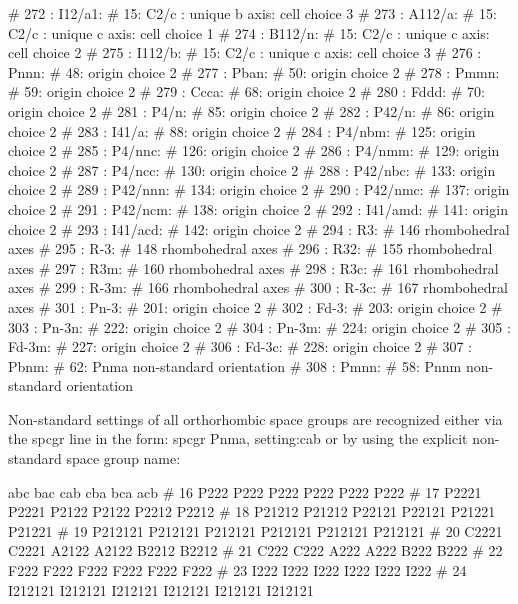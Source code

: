 \begin{MacVerbatim}
# 272 : I12/a1:     #  15: C2/c : unique b axis: cell choice 3
# 273 : A112/a:     #  15: C2/c : unique c axis: cell choice 1
# 274 : B112/n:     #  15: C2/c : unique c axis: cell choice 2
# 275 : I112/b:     #  15: C2/c : unique c axis: cell choice 3
# 276 : Pnnn:       #  48: origin choice 2
# 277 : Pban:       #  50: origin choice 2
# 278 : Pmmn:       #  59: origin choice 2
# 279 : Ccca:       #  68: origin choice 2
# 280 : Fddd:       #  70: origin choice 2
# 281 : P4/n:       #  85: origin choice 2
# 282 : P42/n:      #  86: origin choice 2
# 283 : I41/a:      #  88: origin choice 2
# 284 : P4/nbm:     # 125: origin choice 2
# 285 : P4/nnc:     # 126: origin choice 2
# 286 : P4/nmm:     # 129: origin choice 2
# 287 : P4/ncc:     # 130: origin choice 2
# 288 : P42/nbc:    # 133: origin choice 2
# 289 : P42/nnn:    # 134: origin choice 2
# 290 : P42/nmc:    # 137: origin choice 2
# 291 : P42/ncm:    # 138: origin choice 2
# 292 : I41/amd:    # 141: origin choice 2
# 293 : I41/acd:    # 142: origin choice 2
# 294 : R3:         # 146 rhombohedral axes
# 295 : R-3:        # 148 rhombohedral axes
# 296 : R32:        # 155 rhombohedral axes
# 297 : R3m:        # 160 rhombohedral axes
# 298 : R3c:        # 161 rhombohedral axes
# 299 : R-3m:       # 166 rhombohedral axes
# 300 : R-3c:       # 167 rhombohedral axes
# 301 : Pn-3:       # 201: origin choice 2
# 302 : Fd-3:       # 203: origin choice 2
# 303 : Pn-3n:      # 222: origin choice 2
# 304 : Pn-3m:      # 224: origin choice 2
# 305 : Fd-3m:      # 227: origin choice 2
# 306 : Fd-3c:      # 228: origin choice 2
# 307 : Pbnm:       #  62: Pnma non-standard orientation
# 308 : Pmnn:       #  58: Pnnm non-standard orientation
\end{MacVerbatim}
Non-standard settings of all orthorhombic space groups are recognized 
either via the spcgr line in the form: 
spcgr Pnma, setting:cab 
or by using the explicit non-standard space group name: 
\par
\begin{MacVerbatim}
        abc      bac      cab      cba      bca      acb
#  16   P222     P222     P222     P222     P222     P222
#  17   P2221    P2221    P2122    P2122    P2212    P2212
#  18   P21212   P21212   P22121   P22121   P21221   P21221
#  19   P212121  P212121  P212121  P212121  P212121  P212121
#  20   C2221    C2221    A2122    A2122    B2212    B2212
#  21   C222     C222     A222     A222     B222     B222
#  22   F222     F222     F222     F222     F222     F222
#  23   I222     I222     I222     I222     I222     I222
#  24   I212121  I212121  I212121  I212121  I212121  I212121
\end{MacVerbatim}
